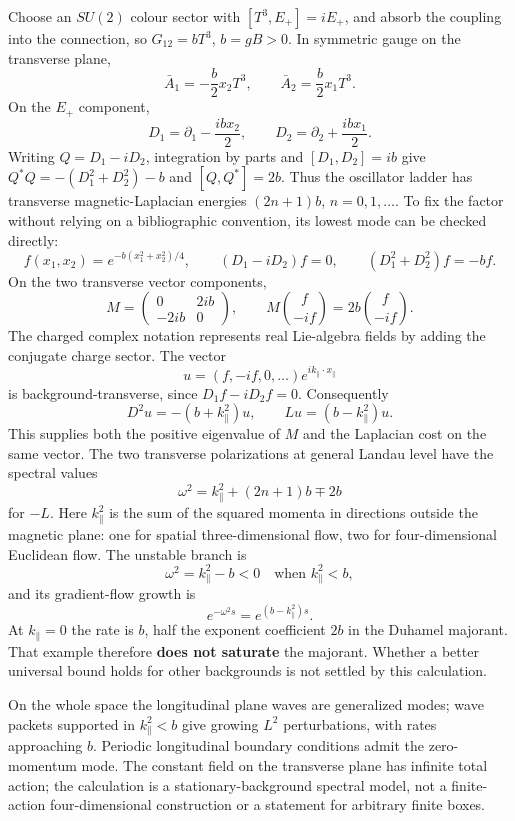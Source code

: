 \documentclass[11pt,a4paper]{article}
\begin{document}
Choose an \(SU(2)\) colour sector with \([T^3,E_+]=iE_+\), and absorb
the coupling into the connection, so \(G_{12}=bT^3\), \(b=gB>0\). In
symmetric gauge on the transverse plane,
\[\bar A_1=-\frac b2x_2T^3,\qquad
\bar A_2=\frac b2x_1T^3.\] On the \(E_+\) component,
\[D_1=\partial_1-\frac{ibx_2}{2},\qquad
D_2=\partial_2+\frac{ibx_1}{2}.\] Writing \(Q=D_1-iD_2\), integration by
parts and \([D_1,D_2]=ib\) give \(Q^*Q=-(D_1^2+D_2^2)-b\) and
\([Q,Q^*]=2b\). Thus the oscillator ladder has transverse
magnetic-Laplacian energies \((2n+1)b\), \(n=0,1,\ldots\). To fix the
factor without relying on a bibliographic convention, its lowest mode
can be checked directly: \[f(x_1,x_2)=e^{-b(x_1^2+x_2^2)/4},\qquad
(D_1-iD_2)f=0,\qquad (D_1^2+D_2^2)f=-bf.\] On the two transverse vector
components, \[M=\begin{pmatrix}0&2ib\\-2ib&0\end{pmatrix},\qquad
M\binom f{-if}=2b\binom f{-if}.\] The charged complex notation
represents real Lie-algebra fields by adding the conjugate charge
sector. The vector
\[u=(f,-if,0,\ldots)e^{ik_\parallel\cdot x_\parallel}\] is
background-transverse, since \(D_1f-iD_2f=0\). Consequently
\[D^2u=-(b+k_\parallel^2)u,\qquad
Lu=(b-k_\parallel^2)u.\] This supplies both the positive eigenvalue of
\(M\) and the Laplacian cost on the same vector. The two transverse
polarizations at general Landau level have the spectral values
\[\omega^2=k_\parallel^2+(2n+1)b\mp2b\] for \(-L\). Here
\(k_\parallel^2\) is the sum of the squared momenta in directions
outside the magnetic plane: one for spatial three-dimensional flow, two
for four-dimensional Euclidean flow. The unstable branch is
\[\omega^2=k_\parallel^2-b<0\quad\text{when }k_\parallel^2<b,\] and its
gradient-flow growth is \[e^{-\omega^2s}=e^{(b-k_\parallel^2)s}.\] At
\(k_\parallel=0\) the rate is \(b\), half the exponent coefficient
\(2b\) in the Duhamel majorant. That example therefore \textbf{does not
saturate} the majorant. Whether a better universal bound holds for other
backgrounds is not settled by this calculation.

On the whole space the longitudinal plane waves are generalized modes;
wave packets supported in \(k_\parallel^2<b\) give growing \(L^2\)
perturbations, with rates approaching \(b\). Periodic longitudinal
boundary conditions admit the zero-momentum mode. The constant field on
the transverse plane has infinite total action; the calculation is a
stationary-background spectral model, not a finite-action
four-dimensional construction or a statement for arbitrary finite boxes.
\end{document}
